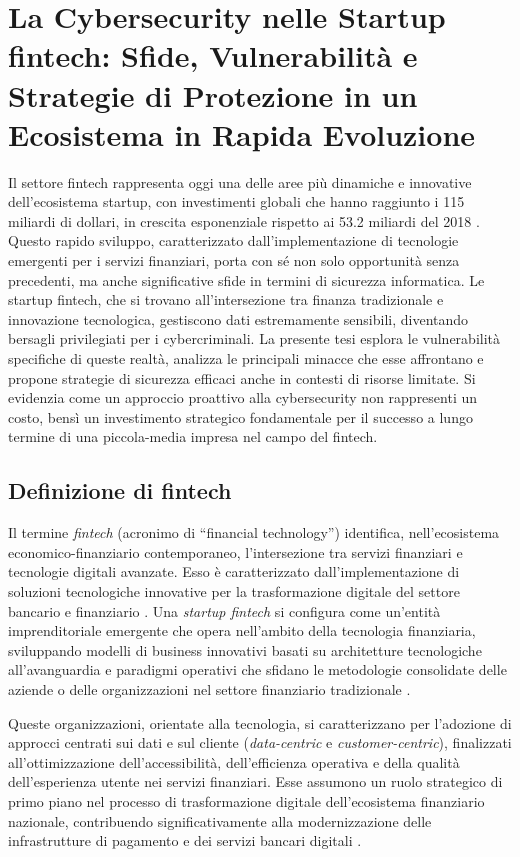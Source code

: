 
\section{La Cybersecurity nelle Startup fintech: Sfide, Vulnerabilità e Strategie di Protezione in un Ecosistema in Rapida Evoluzione}

Il settore fintech rappresenta oggi una delle aree più dinamiche e innovative dell'ecosistema startup, con investimenti globali che hanno raggiunto i 115 miliardi di dollari, in crescita esponenziale rispetto ai 53.2 miliardi del 2018 \cite{gartnerfintech}. Questo rapido sviluppo, caratterizzato dall'implementazione di tecnologie emergenti per i servizi finanziari, porta con sé non solo opportunità senza precedenti, ma anche significative sfide in termini di sicurezza informatica. Le startup fintech, che si trovano all'intersezione tra finanza tradizionale e innovazione tecnologica, gestiscono dati estremamente sensibili, diventando bersagli privilegiati per i cybercriminali. La presente tesi esplora le vulnerabilità specifiche di queste realtà, analizza le principali minacce che esse affrontano e propone strategie di sicurezza efficaci anche in contesti di risorse limitate. Si evidenzia come un approccio proattivo alla cybersecurity non rappresenti un costo, bensì un investimento strategico fondamentale per il successo a lungo termine di una piccola-media impresa nel campo del fintech.

\subsection{Definizione di fintech}

Il termine \textit{fintech} (acronimo di ``financial technology'') identifica, nell'ecosistema economico-finanziario contemporaneo, l'intersezione tra servizi finanziari e tecnologie digitali avanzate. Esso è caratterizzato dall'implementazione di soluzioni tecnologiche innovative per la trasformazione digitale del settore bancario e finanziario \cite{tecnofinanza}. Una \textit{startup fintech} si configura come un'entità imprenditoriale emergente che opera nell'ambito della tecnologia finanziaria, sviluppando modelli di business innovativi basati su architetture tecnologiche all'avanguardia e paradigmi operativi che sfidano le metodologie consolidate delle aziende o delle organizzazioni nel settore finanziario tradizionale \cite{fintech_numeri}.

Queste organizzazioni, orientate alla tecnologia, si caratterizzano per l'adozione di approcci centrati sui dati e sul cliente (\textit{data-centric} e \textit{customer-centric}), finalizzati all'ottimizzazione dell'accessibilità, dell'efficienza operativa e della qualità dell'esperienza utente nei servizi finanziari. Esse assumono un ruolo strategico di primo piano nel processo di trasformazione digitale dell'ecosistema finanziario nazionale, contribuendo significativamente alla modernizzazione delle infrastrutture di pagamento e dei servizi bancari digitali \cite{tecnofinanza}.


